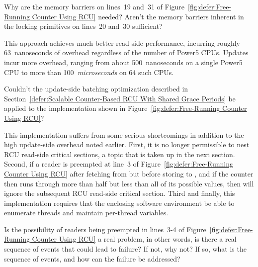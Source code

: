 \QuickQuiz{}
	Why are the memory barriers on lines~19 and~31 of
	Figure~\ref{fig:defer:Free-Running Counter Using RCU}
	needed?
	Aren't the memory barriers inherent in the locking
	primitives on lines~20 and~30 sufficient?
 \QuickQuizEnd

This approach achieves much better read-side performance, incurring
roughly 63~nanoseconds of overhead regardless of the number of
Power5 CPUs.
Updates incur more overhead, ranging from about 500~nanoseconds on
a single Power5 CPU to more than 100~\emph{microseconds} on 64
such CPUs.

\QuickQuiz{}
	Couldn't the update-side batching optimization described in
	Section~\ref{defer:Scalable Counter-Based RCU With Shared Grace Periods}
	be applied to the implementation shown in
	Figure~\ref{fig:defer:Free-Running Counter Using RCU}?
 \QuickQuizEnd

This implementation suffers from some serious shortcomings in
addition to the high update-side overhead noted earlier.
First, it is no longer permissible to nest RCU read-side critical
sections, a topic that is taken up in the next section.
Second, if a reader is preempted at line~3 of
Figure~\ref{fig:defer:Free-Running Counter Using RCU} after fetching from
 but before storing to ,
and if the  counter then runs through more than half
but less than all of its possible values, then 
will ignore the subsequent RCU read-side critical section.
Third and finally, this implementation requires that the enclosing software
environment be able to enumerate threads and maintain per-thread
variables.

\QuickQuiz{}
	Is the possibility of readers being preempted in
	lines~3-4 of Figure~\ref{fig:defer:Free-Running Counter Using RCU}
	a real problem, in other words, is there a real sequence
	of events that could lead to failure?
	If not, why not?
	If so, what is the sequence of events, and how can the
	failure be addressed?
 \QuickQuizEnd

